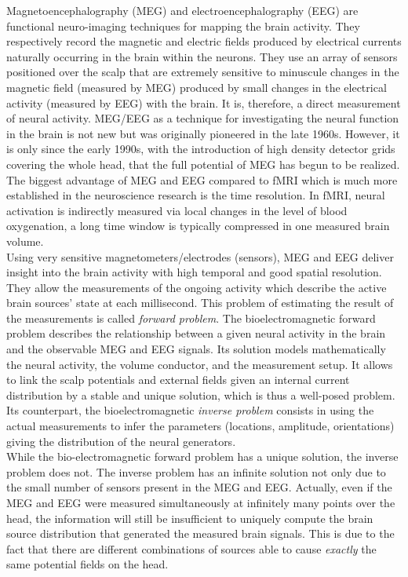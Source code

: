 Magnetoencephalography (MEG) and electroencephalography (EEG) are functional neuro-imaging techniques for mapping the brain activity. They respectively record the magnetic and electric fields produced by electrical currents naturally occurring in the brain within the neurons. They use an array of sensors positioned over the scalp that are extremely sensitive to minuscule changes in the magnetic field (measured by MEG) produced by small changes in the electrical activity (measured by EEG) with the brain. It is, therefore, a direct measurement of neural activity. MEG/EEG as a technique for investigating the neural function in the brain is not new but was originally pioneered in the late 1960s. However, it is only since the early 1990s, with the introduction of high density detector grids covering the whole head, that the full potential of MEG has begun to be realized. The biggest advantage of MEG and EEG compared to fMRI which is much more established in the neuroscience research is the time resolution. In fMRI, neural activation is indirectly measured via local changes in the level of blood oxygenation, a long time window is typically compressed in one measured brain volume. \\

Using very sensitive magnetometers/electrodes (sensors), MEG and EEG deliver insight into the brain activity with high temporal and good spatial resolution. They allow the measurements of the ongoing activity which describe the active brain sources' state at each millisecond. This problem of estimating the result of the measurements is called \textit{forward problem}. The bioelectromagnetic forward problem describes the relationship between a given neural activity in the brain and the observable MEG and EEG signals. Its solution models mathematically the neural activity, the volume conductor, and the measurement setup. It allows to link the scalp potentials and external fields given an internal current distribution by a stable and unique solution, which is thus a well-posed problem. Its counterpart, the bioelectromagnetic \textit{inverse problem} consists in using the actual measurements to infer the parameters (locations, amplitude, orientations) giving the distribution of the neural generators. \\

While the bio-electromagnetic forward problem has a unique solution, the inverse problem does not. The inverse problem has an infinite solution not only due to the small number of sensors present in the MEG and EEG. Actually, even if the MEG and EEG were measured simultaneously at infinitely many points over the head, the information will still be insufficient to uniquely compute the brain source distribution that generated the measured brain signals. This is due to the fact that there are different combinations of sources able to cause \textit{exactly} the same potential fields on the head.

